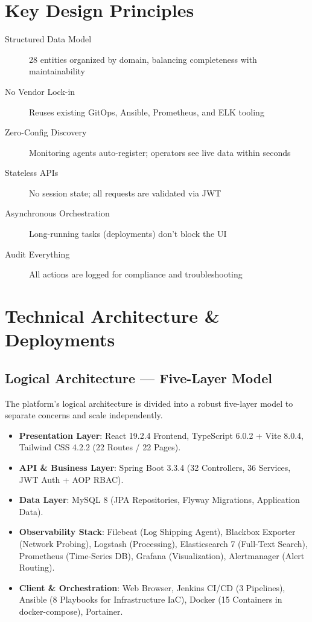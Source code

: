 \documentclass[12pt,a4paper]{report}
\begin{document}
\section{Key Design Principles}

\begin{description}
  \item[Structured Data Model] 28 entities organized by domain, balancing completeness with maintainability
  \item[No Vendor Lock-in] Reuses existing GitOps, Ansible, Prometheus, and ELK tooling
  \item[Zero-Config Discovery] Monitoring agents auto-register; operators see live data within seconds
  \item[Stateless APIs] No session state; all requests are validated via JWT
  \item[Asynchronous Orchestration] Long-running tasks (deployments) don't block the UI
  \item[Audit Everything] All actions are logged for compliance and troubleshooting
\end{description}

\section{Technical Architecture \& Deployments}

\subsection{Logical Architecture — Five-Layer Model}

The platform's logical architecture is divided into a robust five-layer model to separate concerns and scale independently.

\begin{itemize}
    \item \textbf{Presentation Layer}: React 19.2.4 Frontend, TypeScript 6.0.2 + Vite 8.0.4, Tailwind CSS 4.2.2 (22 Routes / 22 Pages).
    \item \textbf{API \& Business Layer}: Spring Boot 3.3.4 (32 Controllers, 36 Services, JWT Auth + AOP RBAC).
    \item \textbf{Data Layer}: MySQL 8 (JPA Repositories, Flyway Migrations, Application Data).
    \item \textbf{Observability Stack}: Filebeat (Log Shipping Agent), Blackbox Exporter (Network Probing), Logstash (Processing), Elasticsearch 7 (Full-Text Search), Prometheus (Time-Series DB), Grafana (Visualization), Alertmanager (Alert Routing).
    \item \textbf{Client \& Orchestration}: Web Browser, Jenkins CI/CD (3 Pipelines), Ansible (8 Playbooks for Infrastructure IaC), Docker (15 Containers in docker-compose), Portainer.
\end{itemize}
\end{document}
